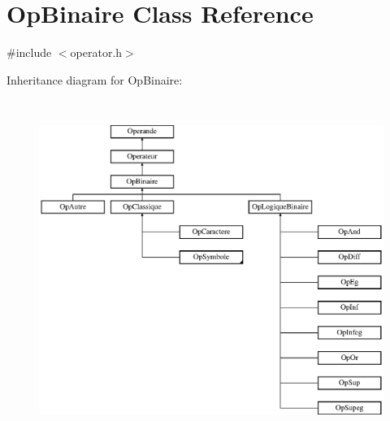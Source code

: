 \hypertarget{class_op_binaire}{}\section{Op\+Binaire Class Reference}
\label{class_op_binaire}


{\ttfamily \#include $<$operator.\+h$>$}

Inheritance diagram for Op\+Binaire\+:\begin{figure}[H]
\begin{center}
\leavevmode
\includegraphics[height=11.107438cm]{class_op_binaire}
\end{center}
\end{figure}
